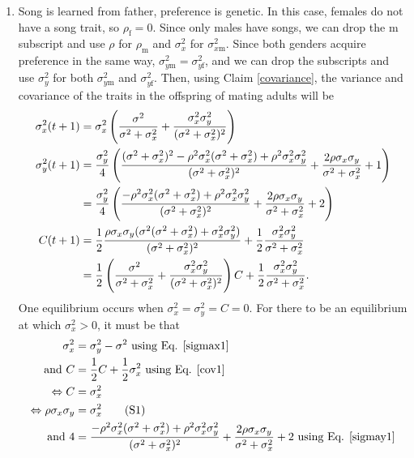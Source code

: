 \documentclass{article}
\newcommand{\x}[1]{\text{#1}}
\newcommand\numberthis{\addtocounter{equation}{1}\tag{\theequation}}
\begin{document}
\begin{enumerate}
\item Song is learned from father, preference is genetic. In this case, females do not have a song trait, so $\rho_\x{f}=0$. Since only males have songs, we can drop the m subscript and use $\rho$ for $\rho_\x{m}$ and $\sigma_x^2$ for $\sigma_{x\x{m}}^2$. Since both genders acquire preference in the same way, $\sigma_{y\x{m}}^2=\sigma_{y\x{f}}^2$, and we can drop the subscripts and use $\sigma_y^2$ for both $\sigma_{y\x{m}}^2$ and $\sigma_{y\x{f}}^2$. Then, using Claim \ref{covariance}, the variance and covariance of the traits in the offspring of mating adults will be 
\begin{align}
\sigma_x^2(t+1)&=\sigma_x^2\left(\frac{\sigma^2}{\sigma^2+\sigma_x^2}+\frac{\sigma_x^2\sigma_y^2}{(\sigma^2+\sigma_x^2)^2}\right) \label{sigmax1}
\\ \sigma_y^2(t+1)&=\frac{\sigma_y^2}{4}\left(\frac{(\sigma^2+\sigma_x^2)^2-\rho^2\sigma_x^2(\sigma^2+\sigma_x^2)+\rho^2\sigma_x^2\sigma_y^2}{(\sigma^2+\sigma_x^2)^2}+\frac{2\rho\sigma_x\sigma_y}{\sigma^2+\sigma_x^2}+1\right) \notag
\\&=\frac{\sigma_y^2}{4}\left(\frac{-\rho^2\sigma_x^2(\sigma^2+\sigma_x^2)+\rho^2\sigma_x^2\sigma_y^2}{(\sigma^2+\sigma_x^2)^2}+\frac{2\rho\sigma_x\sigma_y}{\sigma^2+\sigma_x^2}+2\right) \label{sigmay1}
\\ C(t+1)&=\frac{1}{2}\frac{\rho\sigma_x\sigma_y(\sigma^2(\sigma^2+\sigma_x^2)+\sigma_x^2\sigma_y^2)}{(\sigma^2+\sigma_x^2)^2}+\frac{1}{2}\frac{\sigma_x^2\sigma_y^2}{\sigma^2+\sigma_x^2} \notag
\\&=\frac{1}{2}\left(\frac{\sigma^2}{\sigma^2+\sigma_x^2}+\frac{\sigma_x^2\sigma_y^2}{(\sigma^2+\sigma_x^2)^2}\right)C+\frac{1}{2}\frac{\sigma_x^2\sigma_y^2}{\sigma^2+\sigma_x^2}. \label{cov1}
\end{align}
One equilibrium occurs when $\sigma_x^2=\sigma_y^2=C=0$. For there to be an equilibrium at which $\sigma_x^2>0$, it must be that 
\begin{align*}
\sigma_x^2&=\sigma_y^2-\sigma^2 \text{ using Eq. \ref{sigmax1}} %
\\ \text{ and }
C&=\frac{1}{2}C+\frac{1}{2}\sigma_x^2 \text{ using Eq. \ref{cov1}}
\\ \Leftrightarrow C&=\sigma_x^2 %
\\ \Leftrightarrow  \rho\sigma_x\sigma_y&=\sigma_x^2
  \numberthis \label{rho_condition}
\\ \text{and  }  4&=\frac{-\rho^2\sigma_x^2(\sigma^2+\sigma_x^2)+\rho^2\sigma_x^2\sigma_y^2}{(\sigma^2+\sigma_x^2)^2}+\frac{2\rho\sigma_x\sigma_y}{\sigma^2+\sigma_x^2}+2 \text{ using Eq. \ref{sigmay1}}

\end{align*}
\end{enumerate}
\end{document}
